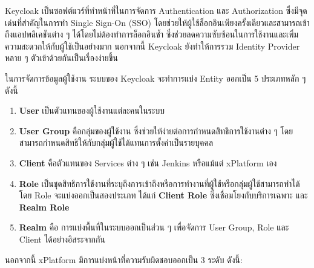 Keycloak เป็นซอฟต์แวร์ที่ทำหน้าที่ในการจัดการ Authentication และ Authorization ซึ่งมีจุดเด่นที่สำคัญในการทำ Single Sign-On (SSO) โดยช่วยให้ผู้ใช้ล็อกอินเพียงครั้งเดียวและสามารถเข้าถึงแอปพลิเคชันต่าง ๆ ได้โดยไม่ต้องทำการล็อกอินซ้ำ ซึ่งช่วยลดความซับซ้อนในการใช้งานและเพิ่มความสะดวกให้กับผู้ใช้เป็นอย่างมาก นอกจากนี้ Keycloak ยังทำให้การรวม Identity Provider หลาย ๆ ตัวเข้าด้วยกันเป็นเรื่องง่ายขึ้น

ในการจัดการข้อมูลผู้ใช้งาน ระบบของ Keycloak จะทำการแบ่ง Entity ออกเป็น 5 ประเภทหลัก ๆ ดังนี้
\begin{enumerate}
    \item \textbf{User} เป็นตัวแทนของผู้ใช้งานแต่ละคนในระบบ
    \item \textbf{User Group} คือกลุ่มของผู้ใช้งาน ซึ่งช่วยให้ง่ายต่อการกำหนดสิทธิการใช้งานต่าง ๆ โดยสามารถกำหนดสิทธิให้กับกลุ่มผู้ใช้ได้แทนการตั้งค่าเป็นรายบุคคล
    \item \textbf{Client} คือตัวแทนของ Services ต่าง ๆ เช่น Jenkins หรือแม้แต่ xPlatform เอง
    \item \textbf{Role} เป็นชุดสิทธิการใช้งานที่ระบุถึงการเข้าถึงหรือการทำงานที่ผู้ใช้หรือกลุ่มผู้ใช้สามารถทำได้ โดย Role จะแบ่งออกเป็นสองประเภท ได้แก่ \textbf{Client Role} ซึ่งเชื่อมโยงกับบริการเฉพาะ และ \textbf{Realm Role}
    \item \textbf{Realm} คือ การแบ่งพื้นที่ในระบบออกเป็นส่วน ๆ เพื่อจัดการ User Group, Role และ Client ได้อย่างอิสระจากกัน
\end{enumerate}
นอกจากนี้ xPlatform มีการแบ่งหน้าที่ความรับผิดชอบออกเป็น 3 ระดับ ดังนี้:

